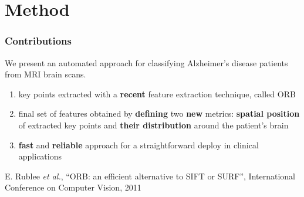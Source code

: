 \section{Method}

\begin{frame}
	\frametitle{Contributions}
	
	\Large
	
	\vspace{0.8cm}
	
	We present an automated approach for classifying Alzheimer's disease patients from MRI brain scans.
	
	\begin{enumerate}
		\item key points extracted with a \textbf{recent} feature extraction technique, called ORB
			  \cite{Rublee11}
		\item final set of features obtained by \textbf{defining} two \textbf{new} metrics:
			  \textbf{spatial position} of extracted key points and \textbf{their distribution} around the
			  patient's brain
		\item \textbf{fast} and \textbf{reliable} approach for a straightforward deploy in clinical
			  applications
	\end{enumerate}
	
	\vspace{0.58cm}
	
	\tiny
	
	\cite{Rublee11} E. Rublee \emph{et al.}, ``ORB: an efficient alternative to SIFT or SURF'',
	International Conference on Computer Vision, 2011
\end{frame}
